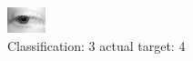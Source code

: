 \begin{figure}[h!]
\begin{center}
\includegraphics[width=0.60\columnwidth]{figures/ID2658_class_3_target_4.png}
\end{center}
\caption{ Classification: 3 actual target: 4}
\label{fig:ID2658_class_3_target_4}
\end{figure}
